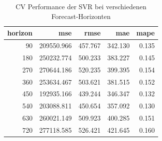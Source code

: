 \begin{table}
\caption{CV Performance der SVR bei verschiedenen Forecast‐Horizonten}
\label{tab:svr_performance}
\begin{tabular}{rrrrr}
\toprule
horizon & mse & rmse & mae & mape \\
\midrule
90 & 209550.966 & 457.767 & 342.130 & 0.135 \\
180 & 250232.774 & 500.233 & 383.227 & 0.145 \\
270 & 270644.186 & 520.235 & 399.395 & 0.154 \\
360 & 253634.467 & 503.621 & 381.515 & 0.152 \\
450 & 192935.166 & 439.244 & 346.347 & 0.132 \\
540 & 203088.811 & 450.654 & 357.092 & 0.130 \\
630 & 260021.149 & 509.923 & 400.285 & 0.151 \\
720 & 277118.585 & 526.421 & 421.645 & 0.160 \\
\bottomrule
\end{tabular}
\end{table}
